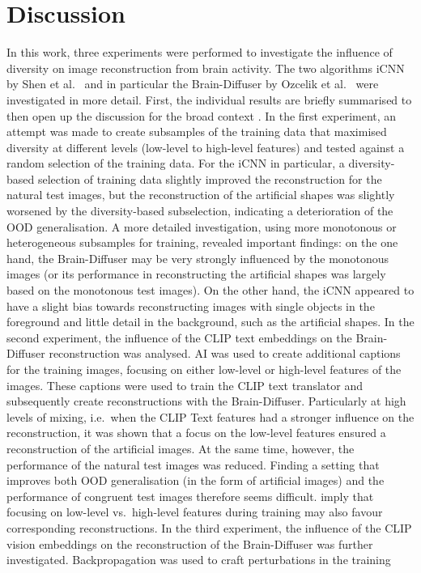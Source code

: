 \chapter{Discussion}


In this work, three experiments were performed to investigate the influence of diversity on image reconstruction from brain activity. The two algorithms iCNN by Shen et al.~\cite{shenDeepImageReconstruction2019} and in particular the Brain-Diffuser by Ozcelik et al.~\cite{ozcelikNaturalSceneReconstruction2023} were investigated in more detail. First, the individual results are briefly summarised to then open up the discussion for the broad context . In the first experiment, an attempt was made to create subsamples of the training data that maximised diversity at different levels (low-level to high-level features) and tested against a random selection of the training data. For the iCNN in particular, a diversity-based selection of training data slightly improved the reconstruction for the natural test images, but the reconstruction of the artificial shapes was slightly worsened by the diversity-based subselection, indicating a deterioration of the OOD generalisation. A more detailed investigation, using more monotonous or heterogeneous subsamples for training, revealed important findings: on the one hand, the Brain-Diffuser may be very strongly influenced by the monotonous images (or its performance in reconstructing the artificial shapes was largely based on the monotonous test images). On the other hand, the iCNN appeared to have a slight bias towards reconstructing images with single objects in the foreground and little detail in the background, such as the artificial shapes. In the second experiment, the influence of the CLIP text embeddings on the Brain-Diffuser reconstruction was analysed. AI was used to create additional captions for the training images, focusing on either low-level or high-level features of the images. These captions were used to train the CLIP text translator and subsequently create reconstructions with the Brain-Diffuser. Particularly at high levels of mixing, i.e.\ when the CLIP Text features had a stronger influence on the reconstruction, it was shown that a focus on the low-level features ensured a  reconstruction of the artificial images. At the same time, however, the performance of the natural test images was reduced. Finding a setting that improves both OOD generalisation (in the form of artificial images) and the performance of congruent test images therefore seems difficult.  imply that focusing on low-level vs.\ high-level features during training may also favour corresponding reconstructions. In the third experiment, the influence of the CLIP vision embeddings on the reconstruction of the Brain-Diffuser was further investigated. Backpropagation was used to craft perturbations in the training 